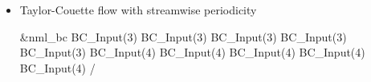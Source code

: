 \begin{itemize}
\begin{nmldescitem}[fontupper=\ttfamily\scriptsize,
                        listing options={escapeinside={!@}{!@}}]
&nml_bc
  BC_Input(3)%
  BC_Input(3)%
  BC_Input(3)%
  BC_Input(3)%
  BC_Input(3)%
  BC_Input(4)%
  BC_Input(4)%
  BC_Input(4)%
  BC_Input(4)%
  BC_Input(4)%
  BC_Input(5)%
  BC_Input(5)%
  BC_Input(5)%
  BC_Input(5)%
  BC_Input(5)%
  BC_Input(6)%
  BC_Input(6)%
  BC_Input(6)%
  BC_Input(6)%
  BC_Input(6)%
/
    \end{nmldescitem}
  \item Taylor-Couette flow\cite{Wang_2021} with streamwise periodicity
    \begin{nmldescitem}[fontupper=\ttfamily\scriptsize,
                        listing options={escapeinside={!@}{!@}}]
&nml_bc
  BC_Input(3)%
  BC_Input(3)%
  BC_Input(3)%
  BC_Input(3)%
  BC_Input(3)%
  BC_Input(4)%
  BC_Input(4)%
  BC_Input(4)%
  BC_Input(4)%
  BC_Input(4)%
/
    \end{nmldescitem}
\end{itemize}


